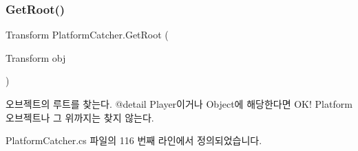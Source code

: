 \subsubsection{\texorpdfstring{GetRoot()}{GetRoot()}}
{\footnotesize\ttfamily Transform Platform\+Catcher.\+Get\+Root (\begin{DoxyParamCaption}\item[{Transform}]{obj }\end{DoxyParamCaption})\hspace{0.3cm}{\ttfamily [private]}}



오브젝트의 루트를 찾는다. @detail Player이거나 Object에 해당한다면 O\+K! Platform 오브젝트나 그 위까지는 찾지 않는다. 



Platform\+Catcher.\+cs 파일의 116 번째 라인에서 정의되었습니다.


